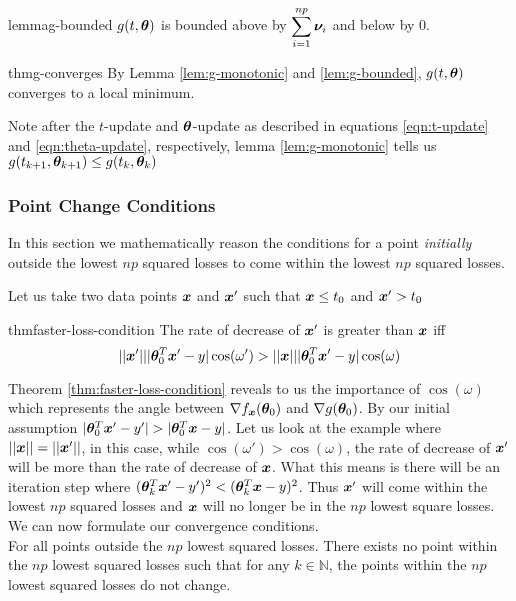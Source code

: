 \documentclass{article} %
\newenvironment{proofsketch}{%
	\renewcommand{\proofname}{Proof Sketch}\proof}{\endproof}
\begin{document}
	\begin{restatable}{lemma}{g-bounded}
		\label{lem:g-bounded}
		$g(t,{\bm{\theta}})$ is bounded above by $\displaystyle \sum_{i=1}^{np}{\bm{\nu}}_i$ and below by $0$.
	\end{restatable}

	\begin{restatable}{thm}{g-converges}
		\label{thm:g-converges}
		By Lemma \ref{lem:g-monotonic} and \ref{lem:g-bounded}, $g(t,{\bm{\theta}})$ converges to a local minimum.
	\end{restatable}
	\begin{proofsketch}
		Note after the $t$-update and ${\bm{\theta}}$-update as described in equations \ref{eqn:t-update} and \ref{eqn:theta-update}, respectively, lemma \ref{lem:g-monotonic} tells us $g(t_{k+1},{\bm{\theta}}_{k+1}) \leq g(t_k,{\bm{\theta}}_k)$
	\end{proofsketch}
	
	\subsubsection{Point Change Conditions}
	
	In this section we mathematically reason the conditions for a point \textit{initially} outside the lowest $np$ squared losses to come within the lowest $np$ squared losses.
	
	Let us take two data points ${\bm{x}}$ and ${\bm{x}}'$ such that ${\bm{x}} \leq t_0$ and ${\bm{x}}' > t_0$
	\begin{restatable}{thm}{faster-loss-condition}
		\label{thm:faster-loss-condition}
		The rate of decrease of ${\bm{x}}'$ is greater than ${\bm{x}}$ iff \begin{equation}|| {\bm{x}}' || |{\bm{\theta}}_0^T{\bm{x}}' - y| \cos(\omega') > ||{\bm{x}}|| |{\bm{\theta}}_0^T{\bm{x}}' - y| \cos(\omega) \end{equation}
	\end{restatable}
	Theorem \ref{thm:faster-loss-condition} reveals to us the importance of $\cos(\omega)$ which represents the angle between $\nabla f_{\bm{x}}({\bm{\theta}}_0)$ and $\nabla g({\bm{\theta}}_0)$. By our initial assumption $|{\bm{\theta}}_0^T{\bm{x}}' - y'| > |{\bm{\theta}}_0^T{\bm{x}} - y|$. Let us look at the example where $|| {\bm{x}} || = || {\bm{x}}' ||$, in this case, while $\cos(\omega') > \cos(\omega)$, the rate of decrease of ${\bm{x}}'$ will be more than the rate of decrease of ${\bm{x}}$. What this means is there will be an iteration step where $({\bm{\theta}}_k^T{\bm{x}}' - y')^2 < ({\bm{\theta}}_k^T{\bm{x}} - y)^2$. Thus ${\bm{x}}'$ will come within the lowest $np$ squared losses and ${\bm{x}}$ will no longer be in the $np$ lowest square losses. We can now formulate our convergence conditions. \\
	For all points outside the $np$ lowest squared losses. There exists no point within the $np$ lowest squared losses such that for any $k \in \mathbb{N}$, the points within the $np$ lowest squared losses do not change. 
			
\end{document}
